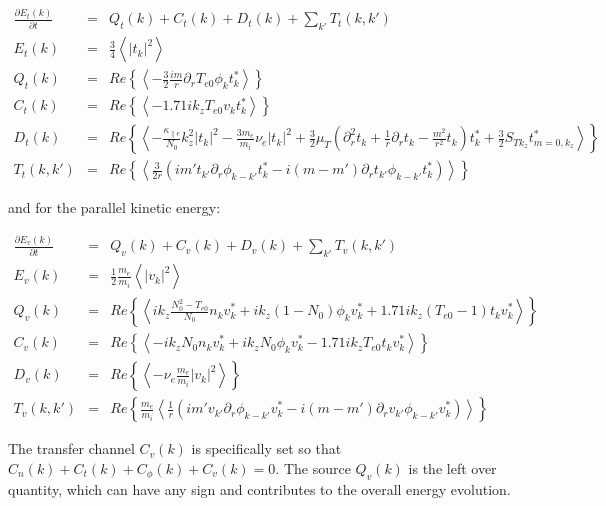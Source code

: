 \documentclass[12pt]{article}
\def\beqar{\begin{eqnarray}}
\def\eeqar{\end{eqnarray}}
\newcommand{\pdiff}[2]{\frac{\partial#1}{\partial#2}}
\newcommand{\pdr}{\partial_r}
\newcommand{\pdrr}{\partial^2_r}
\newcommand{\nue}{\nu_{e}}
\newcommand{\kpe}{\kappa_{\parallel e}}
\newcommand{\fmei}{\frac{m_e}{m_i}}
\begin{document}
\beqar
\label{Fourier_te_evolution}
\pdiff{E_t(k)}{t} & = & Q_t(k) + C_t(k) + D_t(k) + \sum_{k'} T_t(k,k') \\
E_t(k) & = & \frac{3}{4} \left< |t_k|^2  \right> \\
Q_t(k) & = & Re \left\{ \left< - \frac{3}{2} \frac{i m}{r} \pdr T_{e0} \phi_k t_k^* \right> \right\} \\
C_t(k) & = & Re \left\{ \left<  - 1.71 i k_z T_{e0} v_k t_k^* \right> \right\} \\
D_t(k) & = & Re \left\{ \left< -\frac{\kpe}{N_0} k_z^2 |t_k|^2  - \frac{3 m_e}{m_i} \nue |t_k|^2 
+ \frac{3}{2} \mu_T( \pdrr t_k + \frac{1}{r} \pdr t_k - \frac{m^2}{r^2} t_k) t_k^*  + \frac{3}{2} S_{T k_z} t_{m=0,k_z}^*  \right> \right\} \\
T_t(k,k') & = & Re \left\{ \left< \frac{3}{2 r} \left( i m' t_{k'} \pdr \phi_{k-k'} t_k^*  - i (m - m') \pdr t_{k'} \phi_{k-k'} t_k^*        \right) \right> \right\}
\eeqar

and for the parallel kinetic energy:

\beqar
\label{Fourier_vpar_evolution}
\pdiff{E_v(k)}{t} & = & Q_v(k) + C_v(k) + D_v(k) + \sum_{k'} T_v(k,k') \\
E_v(k) & = & \frac{1}{2} \fmei \left< |v_k|^2 \right> \\
Q_v(k) & = & Re \left\{ \left<  i k_z \frac{N_0^2 - T_{e0}}{N_0} n_k v_k^* + i k_z (1 - N_0) \phi_k v_k^* + 1.71 i k_z (T_{e0} -1) t_k v_k^*   \right> \right\} \\
C_v(k) & = & Re \left\{ \left< - i k_z N_0 n_k v_k^* + i k_z N_0 \phi_k v_k^* - 1.71 i k_z T_{e0} t_k v_k^*  \right> \right\} \\
D_v(k) & = & Re \left\{ \left< - \nue \fmei |v_k|^2   \right> \right\} \\
T_v(k,k') & = & Re \left\{ \fmei \left< \frac{1}{r} \left( i m' v_{k'} \pdr \phi_{k-k'} v_k^*  - i (m - m') \pdr v_{k'} \phi_{k-k'} v_k^*        \right) \right> \right\}
\eeqar

The transfer channel $C_v(k)$ is specifically set so that $C_n(k) + C_t(k) + C_\phi(k) + C_v(k) = 0$. 
The source $Q_v(k)$ is the left over quantity, which can have any sign and contributes to the overall energy evolution.





%



%
%
\end{document}

